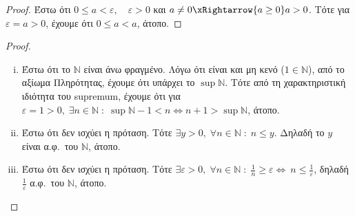 \documentclass[main.tex]{subfiles}
\begin{document}
\begin{proof}
\item {}
  Έστω ότι $ 0 \leq a < \varepsilon, \quad \varepsilon >0 $ και 
  $ a \neq 0 \xRightarrow{a \geq 0} a > 0$. Τότε για $ \varepsilon = 
  a > 0$, έχουμε ότι $ 0 \leq a < a $, άτοπο.
\end{proof}




\begin{proof}
\item {}
  \begin{enumerate}[(i)]
    \item Έστω ότι το $ \mathbb{N} $ είναι άνω φραγμένο. Λόγω ότι 
      είναι και μη κενό ($ 1 \in \mathbb{N} $), από το αξίωμα 
      Πληρότητας, έχουμε ότι υπάρχει το $ \sup \mathbb{N} $. 
      Τότε από τη χαρακτηριστική ιδιότητα του supremum, έχουμε 
      ότι για $ \varepsilon = 1 >0, \; \exists n \in \mathbb{N} 
      \; : \; \sup \mathbb{N}-1 < n \Leftrightarrow n+1 > \sup
      \mathbb{N} $, άτοπο.

    \item Έστω ότι δεν ισχύει η πρόταση. Τότε  $ \exists y >0, \; 
      \forall n \in \mathbb{N} \; : \; n \leq y$. Δηλαδή
      το  $y$  είναι α.φ.\ του $\mathbb{N}$, άτοπο.

    \item Έστω ότι δεν ισχύει η πρόταση. Τότε $ \exists 
      \varepsilon >0 , \; \forall n \in \mathbb{N} \; : \; 
      \frac{1}{n} \geq \varepsilon  \Leftrightarrow \ n \leq 
      \frac{1}{\varepsilon} $, δηλαδή $ \frac{1}{\varepsilon} $ 
      α.φ.\ του $ \mathbb{N} $, άτοπο. 
  \end{enumerate}
\end{proof}
\end{document}
